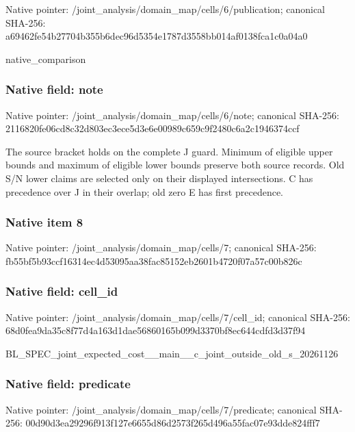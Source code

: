 \documentclass[10pt,a4paper]{article}
\begin{document}
Native pointer: /joint\_analysis/domain\_m\allowbreak{}ap/cells/6/publication; canonical SHA-256: a69462fe54b27704b355b6de\allowbreak{}c96d5354e1787d3558bb014a\allowbreak{}f0138fca1c0a04a0


native\_comparison


\subsubsection{Native field: note}


Native pointer: /joint\_analysis/domain\_map/cells/6/note; canonical SHA-256: 2116820fe06cd8c32d803ec3\allowbreak{}ece5d3e6e00989c659c9f248\allowbreak{}0c6a2c1946374ccf


The source bracket holds on the complete J guard. Minimum of eligible upper bounds and maximum of eligible lower bounds preserve both source records. Old S/N lower claims are selected only on their displayed intersections. C has precedence over J in their overlap; old zero E has first precedence.


\subsubsection{Native item 8}


Native pointer: /joint\_analysis/domain\_map/cells/7; canonical SHA-256: fb55bf5b93ccf16314ec4d53\allowbreak{}095aa38fac85152eb2601b47\allowbreak{}20f07a57c00b826c



\subsubsection{Native field: cell\_id}


Native pointer: /joint\_analysis/domain\_m\allowbreak{}ap/cells/7/cell\_id; canonical SHA-256: 68d0fea9da35c8f77d4a163d\allowbreak{}1dae56860165b099d3370bf8\allowbreak{}ec644cdfd3d37f94


BL\_SPEC\_joint\_expected\_c\allowbreak{}ost\_\_main\_\_c\_joint\_outsi\allowbreak{}de\_old\_s\_20261126


\subsubsection{Native field: predicate}


Native pointer: /joint\_analysis/domain\_m\allowbreak{}ap/cells/7/predicate; canonical SHA-256: 00d90d3ea29296f913f127e6\allowbreak{}655d86d2573f265d496a55fa\allowbreak{}c07e93dde824fff7
\end{document}

